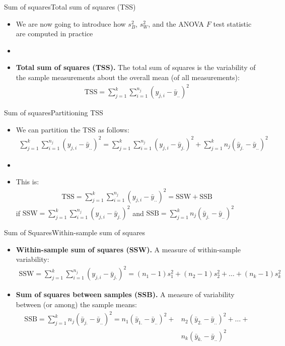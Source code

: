 \documentclass[xcolor=dvipsnames]{beamer}
\begin{document}
\begin{frame}{Sum of squares}{Total sum of squares (TSS)}
	\begin{itemize}
		\item We are now going to introduce how $s^2_B$, $s^2_W$, and the ANOVA $F$ test statistic are computed in practice 
		\item[]
		\item \textbf{Total sum of squares (TSS).} The total sum of squares is the variability of the sample measurements about the overall mean (of all measurements):
		\begin{gather*}
			\text{TSS} = \sum_{j=1}^{k} \sum_{i = 1}^{n_j}\left(y_{j,i} - \bar{y}_{..}\right)^2
		\end{gather*}
	\end{itemize}
\end{frame}

\begin{frame}{Sum of squares}{Partitioning TSS}
	\begin{itemize}
		\item We can partition the TSS as follows:
		\begin{gather*}
			\sum_{j=1}^{k} \sum_{i = 1}^{n_j}\left(y_{j,i} - \bar{y}_{..}\right)^2 = \sum_{j=1}^{k}\sum_{i = 1}^{n_j} (y_{j,i}-\bar{y}_{j.})^2 + \sum_{j=1}^k n_j (\bar{y}_{j.} - \bar{y}_{..})^2
		\end{gather*}
		\item[]
		\item This is:
		\begin{gather*}
			\text{TSS} =\sum_{j=1}^{k} \sum_{i = 1}^{n_j}\left(y_{j,i} - \bar{y}_{..}\right)^2 = \text{SSW} + \text{SSB}
		\end{gather*}
		if $\text{SSW} = \sum_{j=1}^{k}\sum_{i = 1}^{n_j} (y_{j,i}-\bar{y}_{j.})^2$ and $\text{SSB}= \sum_{j=1}^k n_j (\bar{y}_{j.} - \bar{y}_{..})^2$
	\end{itemize}
\end{frame}

\begin{frame}{Sum of Squares}{Within-sample sum of squares}
	\begin{itemize}
		\item \textbf{Within-sample sum of squares (SSW).} A measure of within-sample variability:
		\begin{gather*}
			\text{SSW} = \sum_{j=1}^{k}\sum_{i = 1}^{n_j} (y_{j,i}-\bar{y}_{j.})^2 = (n_1-1)s_1^2 + (n_2-1)s_2^2 + \hdots + (n_k-1)s_k^2
		\end{gather*}
		\item \textbf{Sum of squares between samples (SSB).} A measure of variability between (or among) the sample means:
		\begin{align*}
			\text{SSB} =\sum_{j=1}^k n_j (\bar{y}_{j.} - \bar{y}_{..})^2 = n_1 (\bar{y}_{1.}-\bar{y}_{..})^2 + &n_2 (\bar{y}_{2.}-\bar{y}_{..})^2 + \hdots + \\ &n_k (\bar{y}_{k.}-\bar{y}_{..})^2
		\end{align*}
	\end{itemize}
\end{frame}
\end{document}
